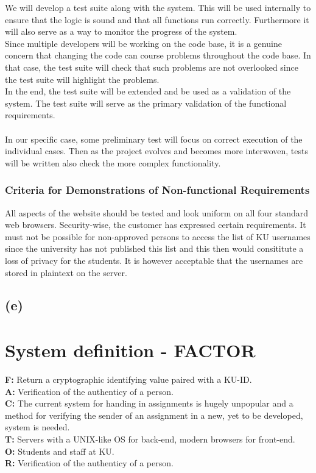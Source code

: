 \documentclass[11pt,a4paper]{article}
\begin{document}
We will develop a test suite along with the system. This will be used internally to ensure that the logic is sound and that all functions run correctly. Furthermore it will also serve as a way to monitor the progress of the system.\\
Since multiple developers will be working on the code base, it is a genuine concern that changing the code can course problems throughout the code base. In that case, the test suite will check that such problems are not overlooked since the test suite will highlight the problems.\\
In the end, the test suite will be extended and be used as a validation of the system. The test suite will serve as the primary validation of the functional requirements. \\\\
In our specific case, some preliminary test will focus on correct execution of the individual cases. Then as the project evolves and becomes more interwoven, tests will be written also check the more complex functionality.

\subsubsection{Criteria for Demonstrations of Non-functional Requirements}
All aspects of the website should be tested and look uniform on all four standard web browsers.
Security-wise, the customer has expressed certain requirements. It must not be possible for non-approved persons to access the list of KU usernames since the university has not published this list and this then would consititute a loss of privacy for the students. It is however acceptable that the usernames are stored in plaintext on the server.
\subsection{(e)}
\section{System definition - FACTOR}
\textbf{F:} Return a cryptographic identifying value paired with a KU-ID. \\
\textbf{A:} Verification of the authenticy of a person. \\
\textbf{C:} The current system for handing in assignments is hugely unpopular and a method for verifying the sender of an assignment in a new, yet to be developed, system is needed.\\
\textbf{T:} Servers with a UNIX-like OS for back-end, modern browsers for front-end. \\
\textbf{O:} Students and staff at KU. \\
\textbf{R:} Verification of the authenticy of a person. \\
\end{document}
